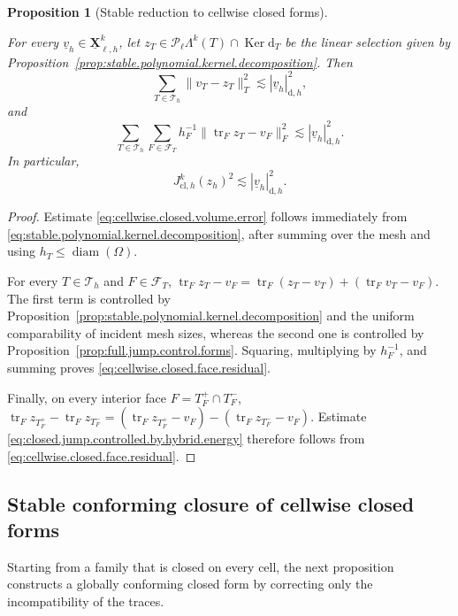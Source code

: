 \documentclass[a4paper,11pt]{article}
\newtheorem{proposition}[theorem]{Proposition}
\theoremstyle{definition}
\newcommand{\DIFF}{\mathrm{d}}
\newcommand{\PL}[2]{\mathcal{P}_{#1}\Lambda^{#2}}
\newcommand{\uXh}[1]{\underline{\boldsymbol{X}}_{\ell,h}^{#1}}
\newcommand{\trc}{\operatorname{tr}}
\newcommand{\Ker}{\operatorname{Ker}}
\begin{document}
\begin{proposition}[Stable reduction to cellwise closed forms]
\label{prop:stable.cellwise.closed.reduction}

For every $\underline v_h\in\uXh{k}$, let $z_T\in\PL{\ell}{k}(T)\cap\Ker\DIFF_T$ be the linear selection given by Proposition~\ref{prop:stable.polynomial.kernel.decomposition}.
Then
\begin{equation}
\label{eq:cellwise.closed.volume.error}
  \sum_{T\in\mathcal T_h}
  \|v_T-z_T\|_T^2
  \lesssim
  |\underline v_h|_{\DIFF,h}^2,
\end{equation}
and
\begin{equation}
\label{eq:cellwise.closed.face.residual}
  \sum_{T\in\mathcal T_h}
  \sum_{F\in\mathcal F_T}
  h_F^{-1}
  \|\trc_Fz_T-v_F\|_F^2
  \lesssim
  |\underline v_h|_{\DIFF,h}^2.
\end{equation}
In particular,
\begin{equation}
\label{eq:closed.jump.controlled.by.hybrid.energy}
  J_{\mathrm{cl},h}^k(z_h)^2
  \lesssim
  |\underline v_h|_{\DIFF,h}^2.
\end{equation}
\end{proposition}

\begin{proof}

Estimate \eqref{eq:cellwise.closed.volume.error} follows immediately from \eqref{eq:stable.polynomial.kernel.decomposition}, after summing over the mesh and using $h_T\leq\operatorname{diam}(\Omega)$.

For every $T\in\mathcal T_h$ and $F\in\mathcal F_T$, $\trc_Fz_T-v_F=\trc_F(z_T-v_T)+(\trc_Fv_T-v_F)$.
The first term is controlled by Proposition~\ref{prop:stable.polynomial.kernel.decomposition} and the uniform comparability of incident mesh sizes, whereas the second one is controlled by Proposition~\ref{prop:full.jump.control.forms}.
Squaring, multiplying by $h_F^{-1}$, and summing proves \eqref{eq:cellwise.closed.face.residual}.

Finally, on every interior face $F=T_F^+\cap T_F^-$, $\trc_Fz_{T_F^+}-\trc_Fz_{T_F^-}=(\trc_Fz_{T_F^+}-v_F)-(\trc_Fz_{T_F^-}-v_F)$.
Estimate \eqref{eq:closed.jump.controlled.by.hybrid.energy} therefore follows from \eqref{eq:cellwise.closed.face.residual}.
\end{proof}

\subsection{Stable conforming closure of cellwise closed forms}
\label{subsec:stable.conforming.closure}
Starting from a family that is closed on every cell, the next proposition constructs a globally conforming closed form by correcting only the incompatibility of the traces.
\end{document}
